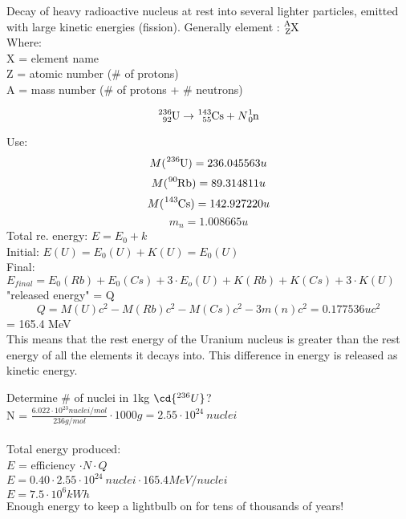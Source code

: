 \documentclass[class=article,crop=false]{standalone}
\begin{document}
\newpage
\begin{question}
Decay of heavy radioactive nucleus at rest into several lighter particles, emitted with large kinetic energies (fission). 
	Generally element : $\ce{^A_ZX}$ \\

	Where:  \\
	X = element name \\
	Z = atomic number (\# of protons) \\
	A = mass number (\# of protons + \# neutrons) \\

	\begin{answer}
		$$ \ce{^{236}_{92}U} \rightarrow \ce{^{143}_{55}Cs} + N\ce{^1_0n} $$
	\end{answer}
	\begin{answer}
		Use: \\
		$$ M(\ce{^{236}U)} = 236.045563u$$
		$$ M(\ce{^{90}Rb)} = 89.314811u$$
		$$ M(\ce{^{143}Cs)} = 142.927220u$$
		$$ m_n = 1.008665 u $$
		Total re. energy: $E = E_0 + k $ \\
		Initial: $E(U) = E_0(U) + K(U) = E_0(U)$ \\
		Final: $E_{final} = E_0(Rb) + E_0(Cs) + 3 \cdot E_o(U) + K(Rb) + K(Cs) + 3 \cdot K(U) $ "released energy" = Q \\ 
		$$ Q = M(U)c^2 - M(Rb)c^2 - M(Cs)c^2 - 3 m(n) c^2 = 0.177536 u c^2 $$
		= 165.4 MeV \\
		This means that the rest energy of the Uranium nucleus is greater than the rest energy of all the elements it decays into. This difference in energy is released as kinetic energy.
	\end{answer}
	\begin{answer}
		Determine # of nuclei in 1kg $\cd{^{236}U}$? \\
		N = $\frac{6.022 \cdot 10^{23} nuclei/mol}{236 g/mol} \cdot 1000g = 2.55 \cdot 10^{24}\ nuclei $ \\\\
		Total energy produced: \\
		$E$ = efficiency $\cdot N \cdot Q$ \\
		$ E = 0.40 \cdot 2.55 \cdot 10^{24}\ nuclei \cdot 165.4 MeV/nuclei$ \\
		$ E = 7.5 \cdot 10^6 kWh$ \\
		Enough energy to keep a lightbulb on for tens of thousands of years!

	\end{answer}
\end{question}
\end{document}
